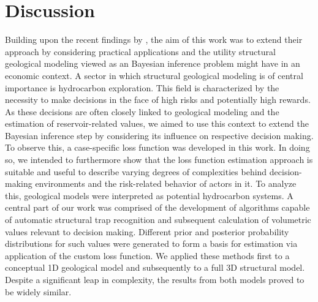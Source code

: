 	\chapter{Discussion}\label{cha:discussion}
	Building upon the recent findings by \citet{delaVarga2016}, the aim of this work was to extend their approach by considering practical applications and the utility structural geological modeling viewed as an Bayesian inference problem might have in an economic context. A sector in which structural geological modeling is of central importance is hydrocarbon exploration. This field is characterized by the necessity to make decisions in the face of high risks and potentially high rewards. As these decisions are often closely linked to geological modeling and the estimation of reservoir-related values, we aimed to use this context to extend the Bayesian inference step by considering its influence on respective decision making. To observe this, a case-specific loss function was developed in this work. In doing so, we intended to furthermore show that the loss function estimation approach is suitable and useful to describe varying degrees of complexities behind decision-making environments and the risk-related behavior of actors in it.
	To analyze this, geological models were interpreted as potential hydrocarbon systems. A central part of our work was comprised of the development of algorithms capable of automatic structural trap recognition and subsequent calculation of volumetric values relevant to decision making. Different prior and posterior probability distributions for such values were generated to form a basis for estimation via application of the custom loss function. We applied these methods first to a conceptual 1D geological model and subsequently to a full 3D structural model. 
	Despite a significant leap in complexity, the results from both models proved to be widely similar.
